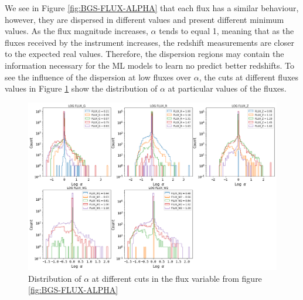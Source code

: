 We see in Figure \ref{fig:BGS-FLUX-ALPHA} that each flux has a similar behaviour, however, they are dispersed in different values and present different minimum values. As the flux magnitude increases, $\alpha$ tends to equal 1, meaning that as the fluxes received by the instrument increases, the redshift measurements are closer to the expected real values. Therefore, the dispersion regions may contain the information necessary for the ML models to learn no predict better redshifts. To see the influence of the dispersion at low fluxes over $\alpha$, the cuts at different fluxes values in Figure \ref{fig:flux_cut_alpha} show the distribution of $\alpha$ at particular values of the fluxes. 
\begin{figure}[h!]
	\centering
	\includegraphics[width=1.0\linewidth]{TeX_files/Imagenes/flux_cut_alpha}
	\caption{Distribution of $\alpha$ at different cuts in the flux variable from figure \ref{fig:BGS-FLUX-ALPHA}}
	\label{fig:flux_cut_alpha}
\end{figure}

